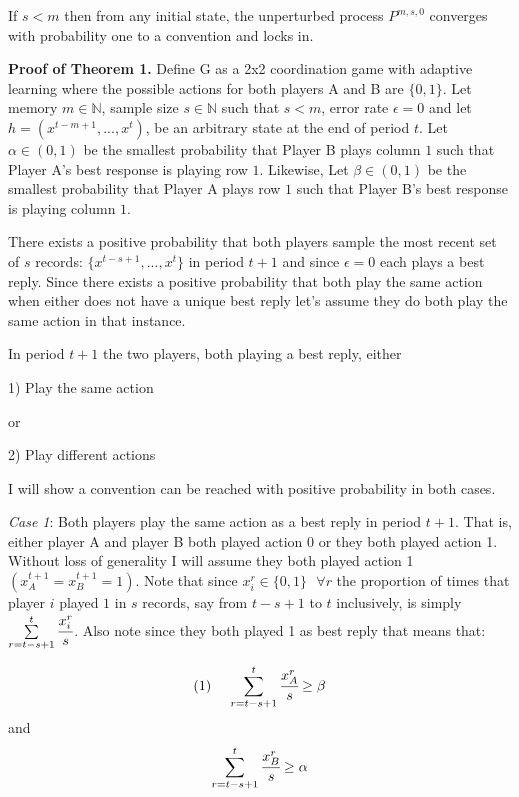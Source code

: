 \documentclass{article}
\begin{document}
\vskip12pt

If $s < m$ then from any initial state, the unperturbed process $P^{m,s,0}$ converges with probability one to a convention and locks in.

\vskip24pt

\textbf{Proof of Theorem 1.} Define G as a 2x2 coordination game with adaptive learning where the possible actions for both players A and B are $\{0 ,1 \}$. Let memory $m \in \mathds{N}$, sample size $s \in \mathds{N}$ such that $s<m$, error rate $\epsilon = 0$ and let $h = (x^{t-m+1},...,x^{t})$, be an arbitrary state at the end of period $t$. Let $\alpha \in (0,1)$ be the smallest probability that Player B plays column $1$ such that Player A's best response is playing row $1$. Likewise, Let $\beta \in (0,1)$ be the smallest probability that Player A plays row $1$ such that Player B's best response is playing column $1$. 

\vskip12pt

There exists a positive probability that both players sample the most recent set of $s$ records: $\{x^{t-s+1},...,x^{t}\}$ in period $t+1$ and since $\epsilon=0$ each plays a best reply. Since there exists a positive probability that both play the same action when either does not have a unique best reply let's assume they do both play the same action in that instance.

\vskip12pt

In period $t+1$ the two players, both playing a best reply, either

1) Play the same action

or 

2) Play different actions

I will show a convention can be reached with positive probability in both cases.

\newpage

\textit{Case 1}: Both players play the same action as a best reply in period $t+1$. That is, either player A and player B both played action 0 or they both played action 1. Without loss of generality I will assume they both played action 1 $(x^{t+1}_A=x^{t+1}_B=1)$. Note that since $x_i^r \in \{0,1\} \hspace{8pt} \forall r$ the proportion of times that player $i$ played $1$ in $s$ records, say from $t-s+1$ to $t$ inclusively, is simply $\sum\limits_{r=t-s+1}^{t} \cfrac{x_i^r}{s}$. Also note since they both played 1 as best reply that means that:

$$\text{(1)} \hspace{12pt} \sum\limits_{r=t-s+1}^t \cfrac{x^r_A}{s} \geq \beta$$
and 
$$\sum\limits_{r=t-s+1}^t \cfrac{x^r_B}{s} \geq \alpha$$
\end{document}
